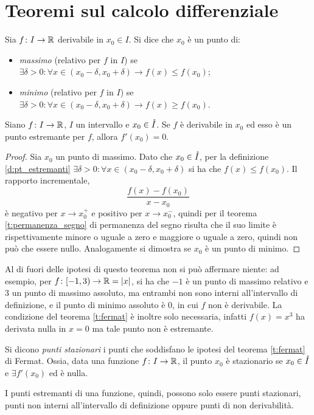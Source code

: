 \section{Teoremi sul calcolo differenziale}
\begin{definizione}
\label{d:pt_estremanti}
Sia $f\colon I\to\mathbb{R}$ derivabile in $x_0\in I$. Si dice che $x_0$ è un punto di:
\begin{itemize}
\item \emph{massimo} (relativo per $f$ in $I$) se $\exists\delta>0\colon\forall x\in(x_0-\delta,x_0+\delta)\rightarrow f(x)\leq f(x_0)$;
\item \emph{minimo} (relativo per $f$ in $I$) se $\exists\delta>0\colon\forall x\in(x_0-\delta,x_0+\delta)\rightarrow f(x)\geq f(x_0)$.
\end{itemize}
\end{definizione}
\begin{teorema}[Fermat]
\label{t:fermat}
Siano $f\colon I\to\mathbb{R}$, $I$ un intervallo e $x_0\in\mathring{I}$. Se $f$ è derivabile in $x_0$ ed esso è un punto estremante per $f$, allora $f'(x_0)=0$.
\end{teorema}
\begin{proof}
Sia $x_0$ un punto di massimo. Dato che $x_0\in\mathring{I}$, per la definizione \ref{d:pt_estremanti} $\exists\delta>0\colon\forall x\in(x_0-\delta,x_0+\delta)$ si ha che $f(x)\leq f(x_0)$. Il rapporto incrementale,
\[
\frac{f(x)-f(x_0)}{x-x_0}
\]
è negativo per $x\to x_0^+$ e positivo per $x\to x_0^-$, quindi per il teorema \ref{t:permanenza_segno} di permanenza del segno risulta che il suo limite è rispettivamente minore o uguale a zero e maggiore o uguale a zero, quindi non può che essere nullo.
Analogamente si dimostra se $x_0$ è un punto di minimo.
\end{proof}
Al di fuori delle ipotesi di questo teorema non si può affermare niente: ad esempio, per $f\colon[-1,3)\to\mathbb{R}=\lvert x\rvert$, si ha che $-1$ è un punto di massimo relativo e 3 un punto di massimo assoluto, ma entrambi non sono interni all'intervallo di definizione, e il punto di minimo assoluto è 0, in cui $f$ non è derivabile.
La condizione del teorema \ref{t:fermat} è inoltre solo necessaria, infatti $f(x)=x^3$ ha derivata nulla in $x=0$ ma tale punto non è estremante.
\begin{definizione}
Si dicono \emph{punti stazionari} i punti che soddisfano le ipotesi del teorema \ref{t:fermat} di Fermat. Ossia, data una funzione $f\colon I\to\mathbb{R}$, il punto $x_0$ è stazionario se $x_0\in\mathring{I}$ e $\exists f'(x_0)$ ed è nulla.
\end{definizione}
I punti estremanti di una funzione, quindi, possono solo essere punti stazionari, punti non interni all'intervallo di definizione oppure punti di non derivabilità.

